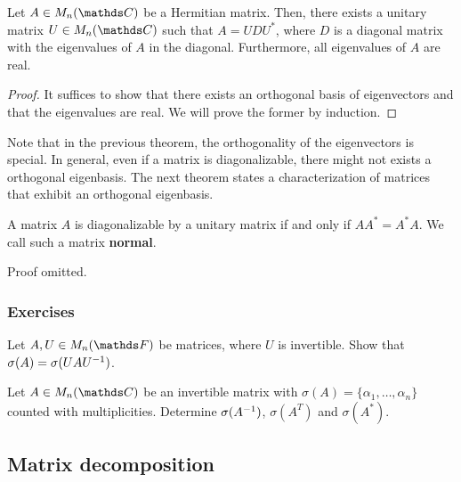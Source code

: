 \documentclass{article}
\begin{document}

\begin{theorem}
Let $A\in M_n(\C)$ be a Hermitian matrix. Then, there exists a unitary matrix $U\in M_n(\C)$ such that $A=UDU^*$, where $D$ is a diagonal matrix with the eigenvalues of $A$ in the diagonal. Furthermore, all eigenvalues of $A$ are real.
\end{theorem}

\begin{proof}
It suffices to show that there exists an orthogonal basis of eigenvectors and that the eigenvalues are real. We will prove the former by induction.
\end{proof}

Note that in the previous theorem, the orthogonality of the eigenvectors is special. In general, even if a matrix is diagonalizable, there might not exists a orthogonal eigenbasis. The next theorem states a characterization of matrices that exhibit an orthogonal eigenbasis. 

\begin{theorem}
A matrix $A$ is diagonalizable by a unitary matrix if and only if $AA^*= A^*A$. We call such a matrix \textbf{normal}.
\end{theorem}

Proof omitted.


\subsubsection{Exercises}

\begin{exercise}\label{ex: char pol indep of basis}
Let $A,U \in M_n(\F)$ be matrices, where $U$ is invertible. Show that $\sigma(A) =\sigma(UAU^{-1})$.
\end{exercise}

\begin{exercise}
Let $A\in M_n(\C)$ be an invertible matrix with $\sigma(A) = \{\alpha_1,\ldots, \alpha_n\}$ counted with multiplicities. Determine $\sigma(A^{-1})$, $\sigma(A^T)$ and $\sigma(A^*)$.
\end{exercise}


\subsection{Matrix decomposition}
\end{document}
